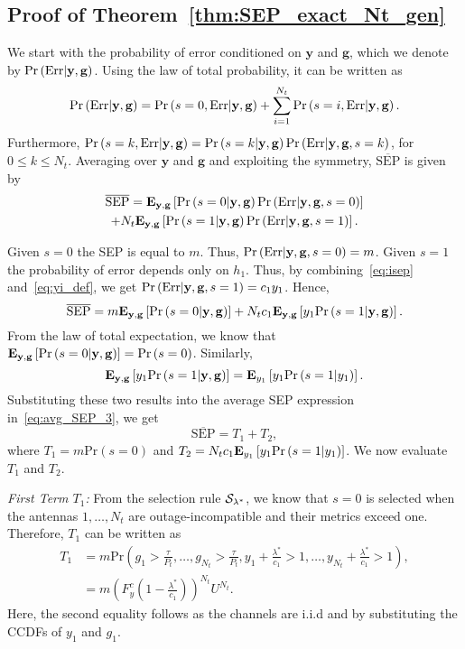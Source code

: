\documentclass[12pt,draftcls,peerreview,onecolumn]{IEEEtran}
\newcommand{\brac}[1]{\left({#1}\right)}
\newcommand{\explow}[2]{{\bf{E}}_{#1}\left[{#2}\right]}
\newcommand{\prob}[1]{\text{Pr}\brac{#1}}
\newcommand{\given}{\arrowvert}
\newcommand{\SEP}{\text{SEP}}
\newcommand{\y}{\mathbf{y}}
\newcommand{\nx}{{0}}
\newcommand{\lam}{\lambda}
\newcommand{\lamstar}{\lam^{*}}
\newcommand{\Err}{{\text{Err}}}
\newcommand{\termone}{T_1}
\newcommand{\termtwo}{T_2}
\newcommand{\Nt}{{N_t}}
\newcommand{\Pt}{{P_t}}
\newcommand{\such}{h}
\newcommand{\puch}{g}
\newcommand{\hk}[1]{{\such_{#1}}}
\newcommand{\gk}[1]{{\puch_{#1}}}
\newcommand{\g}{\mathbf{\puch}}
\newcommand{\itau}{\tau}
\newcommand{\cone}{c_{1}}
\newcommand{\m}{\cone}
\newcommand{\taubypt}{\frac{\itau}{\Pt}}
\newcommand{\gkgrtaubypt}[1]{{\gk{#1}}>\taubypt}
\newcommand{\lamstarbym}{\frac{\lamstar}{\m}}
\newcommand{\yk}[1]{y_{#1}}
\newcommand{\un}{U}
\newcommand{\zerosep}{m}
\newcommand{\callamstarrule}{\cal S_{\lam^{*}}}
\newcommand{\avgSEP}{\overline{\SEP}}
\newcommand{\ccdfy}[1]{F^{c}_{y}\left(#1 \right)}
\begin{document}
\subsection{Proof of Theorem~\ref{thm:SEP_exact_Nt_gen}}
\label{proof:SEP_exact_Nt_gen}
We start with the probability of error conditioned on $\y$ and $\g$, which we denote by $\prob{\Err \given \y,\g}$. Using the law of total probability, it can be written as
%
\begin{equation}
\prob{\Err \given \y,\g} =  \prob{s=\nx,\Err\given\y,\g} + \sum_{i=1}^{\Nt}\prob{s=i,\Err\given\y,\g}.
\label{eq:Perr_all_h}
\end{equation}
%
Furthermore, $\prob{s=k,\Err\given\y,\g}=\prob{s=k\given\y,\g}\prob{\Err\given\y,\g,s=k}$, for $0\leq k \leq \Nt$. Averaging over $\y$ and $\g$ and exploiting the symmetry, $\avgSEP$ is given by
\begin{multline}
\label{eq:avg_SEP_1}
 \avgSEP = \explow{\y,\g}{\prob{s=\nx\given\y,\g}\prob{\Err\given\y,\g,s=\nx}} \\+ \Nt\explow{\y,\g}{\prob{s=1\given\y,\g}\prob{\Err\given\y,\g,s=1}}. 
\end{multline}

Given $s=0$ the SEP is equal to $\zerosep$.  Thus, $\prob{\Err\given\y,\g,s=\nx}=\zerosep$. Given $s=1$ the probability of error depends only on $\hk{1}$. Thus, by combining~\eqref{eq:isep} and~\eqref{eq:yi_def}, we get $\prob{\Err\given\y,\g,s=1}=\m \yk{1}$. Hence,
\begin{equation}
\label{eq:avg_SEP_3}
\avgSEP  = \zerosep \explow{\y,\g}{\prob{s=\nx\given\y,\g}} + \Nt\m\explow{\y,\g}{\yk{1}\prob{s=1\given\y,\g}}.
\end{equation}
From the law of total expectation, we know that $\explow{\y,\g}{\prob{s=\nx\given\y,\g}} = \prob{s = 0}$.
Similarly, 
\begin{equation}
\label{eq:avg_sep_3_one}
\explow{\y,\g}{\yk{1}\prob{s = 1\given \y,\g} } = \explow{\yk{1}}{\yk{1} \prob{s = 1\given \yk{1}}  }.
\end{equation}
Substituting these  two results into the average SEP expression in~\eqref{eq:avg_SEP_3}, we get
%
\begin{equation}
\label{eq:avg_SEP_4}
\avgSEP  = \termone + \termtwo,
\end{equation}
%
where $\termone=\zerosep \prob{s = 0}$ and $\termtwo=\Nt\m \explow{\yk{1}}{ \yk{1}\prob{s = 1\given \yk{1}}}$. We now evaluate $\termone$ and $\termtwo$.

{\em First Term $\termone$:}
From the selection rule $\callamstarrule$, we know that ${s=0}$ is selected when the antennas $1,\ldots,\Nt$ are outage-incompatible and their metrics exceed one. Therefore, $\termone$ can be written as 
\begin{align}
\termone &= \zerosep\prob{\gkgrtaubypt{1},\dots,\gkgrtaubypt{\Nt}, \yk{1}\!+\!\lamstarbym >1,\ldots,\yk{\Nt}\!+\!\lamstarbym >1},\\
&= \zerosep\left( \ccdfy{1-\lamstarbym}  \right)^{\Nt} {\un}^{\Nt}.
\label{eq:termone_a}
\end{align}
Here, the second equality follows as the channels are i.i.d and by substituting the CCDFs of $\yk{1}$ and $\gk{1}$.
\end{document}
